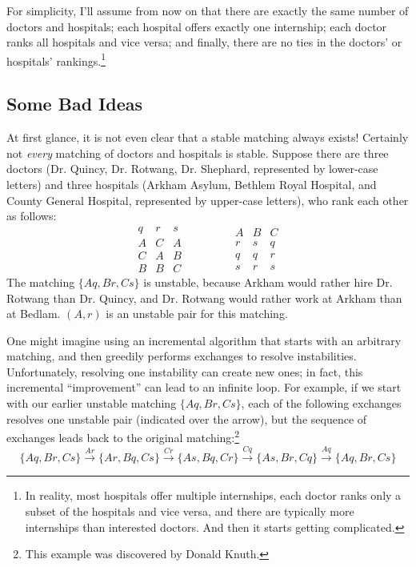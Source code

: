 For simplicity, I’ll assume from now on that there are exactly the same number of doctors and hospitals; each hospital offers exactly one internship; each doctor ranks all hospitals and vice versa; and finally, there are no ties in the doctors’ or hospitals’ rankings.\footnote{In reality, most hospitals offer multiple internships, each doctor ranks only a subset of the hospitals and vice versa, and there are typically more internships than interested doctors. And then it starts getting complicated.}

\subsection{Some Bad Ideas}

At first glance, it is not even clear that a stable matching always exists!
Certainly not \textit{every} matching of doctors and hospitals is stable.
Suppose there are three doctors (Dr. Quincy, Dr. Rotwang, Dr. Shephard, represented by lower-case letters) and three hospitals (Arkham Asylum, Bethlem Royal Hospital, and County General Hospital, represented by upper-case letters), who rank each other as follows:
\[
\begin{array}{ccc}
q & r & s\\
\hline
A & C & A\\
C & A & B\\
B & B & C
\end{array}
\qquad\qquad
\begin{array}{ccc}
A & B & C\\
\hline
r & s & q\\
q & q & r\\
s & r & s
\end{array}
\]
The matching $\{Aq, Br, Cs\}$ is unstable, because Arkham would rather hire Dr. Rotwang than Dr. Quincy, and Dr. Rotwang would rather work at Arkham than at Bedlam.
$(A, r)$ is an unstable pair for this matching.

One might imagine using an incremental algorithm that starts with an arbitrary matching, and then greedily performs exchanges to resolve instabilities.
Unfortunately, resolving one instability can create new ones; in fact, this incremental “improvement” can lead to an infinite loop.
For example, if we start with our earlier unstable matching $\{Aq, Br, Cs\}$, each of the following exchanges resolves one unstable pair (indicated over the arrow), but the sequence of exchanges leads back to the original matching:\footnote{This example was discovered by Donald Knuth.}
\[
\{Aq, Br, Cs\} \xrightarrow{Ar} \{Ar, Bq, Cs\} \xrightarrow{Cr} \{As, Bq, Cr\} \xrightarrow{Cq} \{As, Br, Cq\} \xrightarrow{Aq} \{Aq, Br, Cs\}
\]

